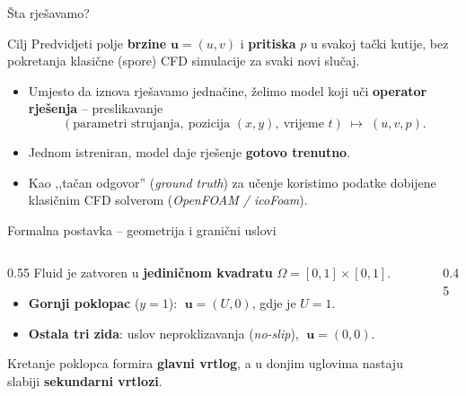 \documentclass[10pt,aspectratio=169]{beamer}
\begin{document}
\begin{frame}{Šta rješavamo?}
  \begin{block}{Cilj}
    Predvidjeti polje \textbf{brzine} $\mathbf{u}=(u,v)$ i \textbf{pritiska} $p$ u svakoj tački
    kutije, bez pokretanja klasične (spore) CFD simulacije za svaki novi slučaj.
  \end{block}

  \vfill
  \begin{itemize}
    \item Umjesto da iznova rješavamo jednačine, želimo model koji uči
          \textbf{operator rješenja} -- preslikavanje
          \[
            (\text{parametri strujanja},\ \text{pozicija } (x,y),\ \text{vrijeme } t)
            \;\longmapsto\;
            (u, v, p).
          \]
    \item Jednom istreniran, model daje rješenje \textbf{gotovo trenutno}.
    \item Kao ,,tačan odgovor'' (\emph{ground truth}) za učenje koristimo podatke
          dobijene klasičnim CFD solverom (\emph{OpenFOAM / icoFoam}).
  \end{itemize}
\end{frame}

\begin{frame}{Formalna postavka -- geometrija i granični uslovi}
  \begin{columns}[T]
    \begin{column}{0.55\textwidth}
      \small
      Fluid je zatvoren u \textbf{jediničnom kvadratu} $\Omega=[0,1]\times[0,1]$.
      \medskip
      \begin{itemize}
        \item \textbf{Gornji poklopac} ($y=1$): $\;\mathbf{u}=(U,0)$, gdje je $U=1$.
        \item \textbf{Ostala tri zida}: uslov neproklizavanja (\emph{no-slip}),
              $\;\mathbf{u}=(0,0)$.
      \end{itemize}
      \medskip
      Kretanje poklopca formira \textbf{glavni vrtlog}, a u donjim uglovima
      nastaju slabiji \textbf{sekundarni vrtlozi}.
    \end{column}
    \begin{column}{0.45\textwidth}
      \centering
    \end{column}
  \end{columns}
\end{frame}
\end{document}
